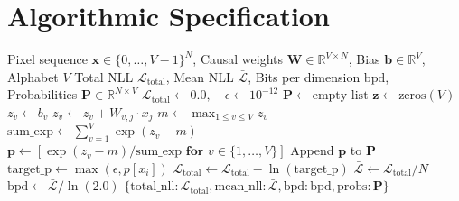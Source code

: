\documentclass[11pt,a4paper]{article}
\theoremstyle{definition}
\begin{document}
\section{Algorithmic Specification}

\begin{algorithm}[H]
\caption{Autoregressive PixelCNN Causal Forward Pass}
\label{alg:pixelcnn}
\begin{algorithmic}[1]
\Require Pixel sequence $\mathbf{x} \in \{0, \dots, V-1\}^N$, Causal weights $\mathbf{W} \in \mathbb{R}^{V \times N}$, Bias $\mathbf{b} \in \mathbb{R}^V$, Alphabet $V$
\Ensure Total NLL $\mathcal{L}_{\text{total}}$, Mean NLL $\bar{\mathcal{L}}$, Bits per dimension $\text{bpd}$, Probabilities $\mathbf{P} \in \mathbb{R}^{N \times V}$
\State $\mathcal{L}_{\text{total}} \gets 0.0, \quad \epsilon \gets 10^{-12}$
\State $\mathbf{P} \gets \text{empty list}$
    \State $\mathbf{z} \gets \text{zeros}(V)$
        \State $z_v \gets b_v$
         
            \State $z_v \gets z_v + W_{v, j} \cdot x_j$
        \EndFor
    \EndFor
    \State $m \gets \max_{1 \le v \le V} z_v$
    \State $\text{sum\_exp} \gets \sum_{v=1}^V \exp(z_v - m)$
    \State $\mathbf{p} \gets [\exp(z_v - m) / \text{sum\_exp} \textbf{ for } v \in \{1, \dots, V\}]$
    \State Append $\mathbf{p}$ to $\mathbf{P}$
    \State $\text{target\_p} \gets \max(\epsilon, p[x_i])$
    \State $\mathcal{L}_{\text{total}} \gets \mathcal{L}_{\text{total}} - \ln(\text{target\_p})$
\EndFor
\State $\bar{\mathcal{L}} \gets \mathcal{L}_{\text{total}} / N$
\State $\text{bpd} \gets \bar{\mathcal{L}} / \ln(2.0)$
\State \Return $\{\text{total\_nll}: \mathcal{L}_{\text{total}}, \text{mean\_nll}: \bar{\mathcal{L}}, \text{bpd}: \text{bpd}, \text{probs}: \mathbf{P}\}$
\end{algorithmic}
\end{algorithm}
\end{document}

